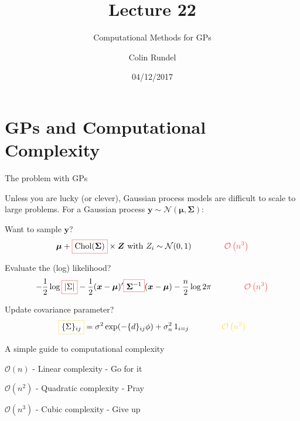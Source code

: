 \documentclass[11pt,ignorenonframetext,]{beamer}
\title{Lecture 22}
\subtitle{Computational Methods for GPs}
\author{Colin Rundel}
\date{04/12/2017}
\newcommand{\hlr}[1]{\fcolorbox{redhl}{white}{$\displaystyle #1$}}
\newcommand{\hly}[1]{\fcolorbox{yellowhl}{white}{$\displaystyle #1$}}
\begin{document}
\frame{\titlepage}

\section{GPs and Computational
Complexity}\label{gps-and-computational-complexity}

\begin{frame}{The problem with GPs}

Unless you are lucky (or clever), Gaussian process models are difficult
to scale to large problems. For a Gaussian process
\(\bm{y} \sim \mathcal{N}(\bm{\mu},\bm{\Sigma})\):

\pause

\vspace{3mm}

Want to sample \(\bm{y}\)?
\[ \bm{\mu} + \hlr{\text{Chol}(\bm{\Sigma})} \times \bm{Z} \text{ with } Z_i \sim \mathcal{N}(0,1) \qquad \qquad \color{redhl}{\mathcal{O}\left(n^3\right)} \]

\pause

Evaluate the (log) likelihood?
\[ -\frac{1}{2} \log \hlr{|\Sigma|} - \frac{1}{2} (\bm{x}-\bm{\mu})' \hlr{\bm{\Sigma}^{-1}} (\bm{x}-\bm{\mu}) - \frac{n}{2}\log 2\pi \qquad \qquad \color{redhl}{\mathcal{O}\left(n^3\right)}\]

\pause

Update covariance parameter?
\[ \hly{\{\Sigma\}_{ij}} = \sigma^2 \exp(-\{d\}_{ij}\phi) + \sigma^2_n \, 1_{i=j} \qquad \qquad \color{yellowhl}{\mathcal{O}\left(n^2\right)}\]

\end{frame}

\begin{frame}{A simple guide to computational complexity}

\Large

\begin{center}
\vfill
$\mathcal{O}\left(n\right)$ - Linear complexity \pause- Go for it \pause

\vspace{15mm}

$\mathcal{O}\left(n^2\right)$ - Quadratic complexity \pause- Pray \pause

\vspace{15mm}

$\mathcal{O}\left(n^3\right)$ - Cubic complexity \pause- Give up

\vfill
\end{center}

\end{frame}
\end{document}
